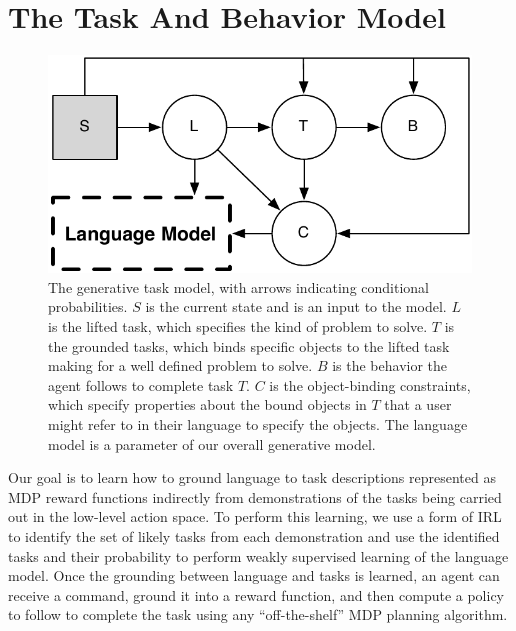 \documentclass[conference]{IEEEtran}
\begin{document}
\section{The Task And Behavior Model}
\begin{figure}[tbp]
\begin{center}
\includegraphics[width=.7\columnwidth]{images/taskModel}
\caption{The generative task model, with arrows indicating conditional probabilities. $S$ is the current state and is an input to the model. $L$ is the lifted task, which specifies the kind of problem to solve. $T$ is the grounded tasks, which binds specific objects to the lifted task making for a well defined problem to solve. $B$ is the behavior the agent follows to complete task $T$. $C$ is the object-binding constraints, which specify properties about the bound objects in $T$ that a user might refer to in their language to specify the objects. The language model is a parameter of our overall generative model.}
\label{fig:tm}
\end{center}
\end{figure}
Our goal is to learn how to ground language to task descriptions represented as MDP reward functions indirectly from demonstrations of the tasks being carried out in the low-level action space. To perform this learning, we use a form of IRL to identify the set of likely tasks from each demonstration and use the identified tasks and their probability to perform weakly supervised learning of the language model. Once the grounding between language and tasks is learned, an agent can receive a command, ground it into a reward function, and then compute a policy to follow to complete the task using any ``off-the-shelf'' MDP planning algorithm.
\end{document}
